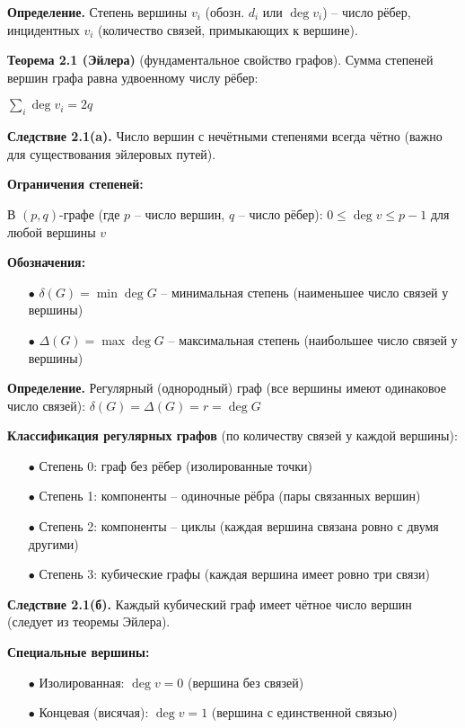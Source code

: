 \noindent\textbf{Определение.} Степень вершины $v_i$ (обозн. $d_i$ или $\deg v_i$) -- число рёбер, инцидентных $v_i$ (количество связей, примыкающих к вершине).

\noindent\textbf{Теорема 2.1 (Эйлера)} (фундаментальное свойство графов). Сумма степеней вершин графа равна удвоенному числу рёбер:

$\sum_i \deg v_i = 2q$

\noindent\textbf{Следствие 2.1(a).} Число вершин с нечётными степенями всегда чётно (важно для существования эйлеровых путей).

\noindent\textbf{Ограничения степеней:}

В $(p,q)$-графе (где $p$ -- число вершин, $q$ -- число рёбер): $0 \leq \deg v \leq p-1$ для любой вершины $v$

\noindent\textbf{Обозначения:}

\begin{itemize}

\item[$\bullet$] $\delta(G) = \min \deg G$ -- минимальная степень (наименьшее число связей у вершины)

\item[$\bullet$] $\Delta(G) = \max \deg G$ -- максимальная степень (наибольшее число связей у вершины)

\end{itemize}

\noindent\textbf{Определение.} Регулярный (однородный) граф (все вершины имеют одинаковое число связей): $\delta(G) = \Delta(G) = r = \deg G$

\noindent\textbf{Классификация регулярных графов} (по количеству связей у каждой вершины):

\begin{itemize}

\item[$\bullet$] Степень 0: граф без рёбер (изолированные точки)

\item[$\bullet$] Степень 1: компоненты -- одиночные рёбра (пары связанных вершин)

\item[$\bullet$] Степень 2: компоненты -- циклы (каждая вершина связана ровно с двумя другими)

\item[$\bullet$] Степень 3: кубические графы (каждая вершина имеет ровно три связи)

\end{itemize}

\noindent\textbf{Следствие 2.1(б).} Каждый кубический граф имеет чётное число вершин (следует из теоремы Эйлера).

\noindent\textbf{Специальные вершины:}

\begin{itemize}

\item[$\bullet$] Изолированная: $\deg v = 0$ (вершина без связей)

\item[$\bullet$] Концевая (висячая): $\deg v = 1$ (вершина с единственной связью)

\end{itemize}
